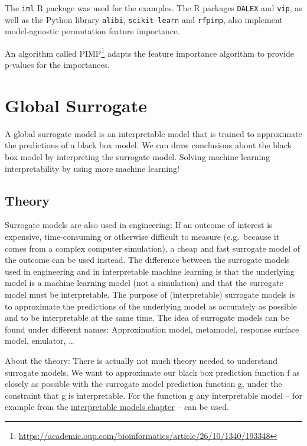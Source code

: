 \documentclass[
  12pt,
]{krantz}
\renewcommand{\href}[2]{#2\footnote{\url{#1}}}
\begin{document}
The \texttt{iml} R package was used for the examples.
The R packages \texttt{DALEX} and \texttt{vip}, as well as the Python library \texttt{alibi}, \texttt{scikit-learn} and \texttt{rfpimp}, also implement model-agnostic permutation feature importance.

An algorithm called \href{https://academic.oup.com/bioinformatics/article/26/10/1340/193348}{PIMP} adapts the feature importance algorithm to provide p-values for the importances.

\newpage

\hypertarget{global}{%
\section{Global Surrogate}\label{global}}

A global surrogate model is an interpretable model that is trained to approximate the predictions of a black box model.
We can draw conclusions about the black box model by interpreting the surrogate model.
Solving machine learning interpretability by using more machine learning!

\hypertarget{theory-4}{%
\subsection{Theory}\label{theory-4}}

Surrogate models are also used in engineering:
If an outcome of interest is expensive, time-consuming or otherwise difficult to measure (e.g.~because it comes from a complex computer simulation), a cheap and fast surrogate model of the outcome can be used instead.
The difference between the surrogate models used in engineering and in interpretable machine learning is that the underlying model is a machine learning model (not a simulation) and that the surrogate model must be interpretable.
The purpose of (interpretable) surrogate models is to approximate the predictions of the underlying model as accurately as possible and to be interpretable at the same time.
The idea of surrogate models can be found under different names:
Approximation model, metamodel, response surface model, emulator, \ldots{}

About the theory:
There is actually not much theory needed to understand surrogate models.
We want to approximate our black box prediction function f as closely as possible with the surrogate model prediction function g, under the constraint that g is interpretable.
For the function g any interpretable model -- for example from the \protect\hyperlink{simple}{interpretable models chapter} -- can be used.
\end{document}
